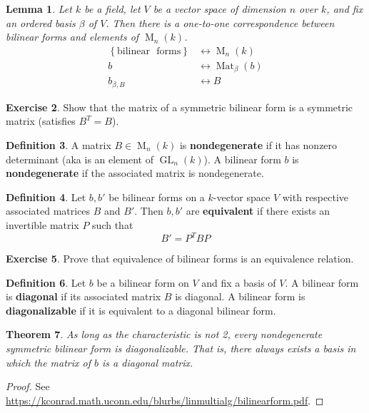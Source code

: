 \documentclass[12pt]{article}
\newtheorem{theorem}{Theorem}
\newtheorem{lemma}[theorem]{Lemma}
\theoremstyle{definition}
\newtheorem{definition}[theorem]{Definition}
\newtheorem{exercise}[theorem]{Exercise}
\numberwithin{theorem}{subsection}
\newcommand{\lb}{\left\{}
\newcommand{\rb}{\right\}}
\newcommand{\tbf}{\textbf}
\DeclareMathOperator{\M}{M}
\DeclareMathOperator{\Mat}{Mat}
\DeclareMathOperator{\GL}{GL}
\begin{document}
\begin{lemma}
Let $k$ be a field, let $V$ be a vector space of dimension $n$ over $k$, and fix an ordered basis $\beta$ of $V$. Then there is a one-to-one correspondence between bilinear forms and elements of $\M_n(k)$.
\begin{align*}
	\lb \mathrm{bilinear} \text{ } \mathrm{forms} \rb &\leftrightarrow \M_n(k) \\
	b &\leftrightarrow \Mat_\beta(b) \\
	b_{\beta, B} &\leftrightarrow B
\end{align*}
\end{lemma}

\begin{exercise}
Show that the matrix of a symmetric bilinear form is a symmetric matrix (satisfies $B^T = B$).
\end{exercise}

\begin{definition}
A matrix $B \in \M_n(k)$ is \tbf{nondegenerate} if it has nonzero determinant (aka is an element of $\GL_n(k)$). A bilinear form $b$ is \tbf{nondegenerate} if the associated matrix is nondegenerate.
\end{definition}

\begin{definition}
Let $b, b'$ be bilinear forms on a $k$-vector space $V$ with respective associated matrices $B$ and $B'$. Then $b,b'$ are \tbf{equivalent} if there exists an invertible matrix $P$ such that
\[
	B' = P^T B P
\]
\end{definition}

\begin{exercise}
Prove that equivalence of bilinear forms is an equivalence relation.
\end{exercise}

\begin{definition}
Let $b$ be a bilinear form on $V$ and fix a basis of $V$. A bilinear form is \tbf{diagonal} if its associated matrix $B$ is diagonal. A bilinear form is \tbf{diagonalizable} if it is equivalent to a diagonal bilinear form. 
\end{definition}

\begin{theorem}
\label{nondegenerate symmetric form is diagonal}
As long as the characteristic is not 2, every nondegenerate symmetric bilinear form is diagonalizable. That is, there always exists a basis in which the matrix of $b$ is a diagonal matrix.
\end{theorem}
\begin{proof}
See \url{https://kconrad.math.uconn.edu/blurbs/linmultialg/bilinearform.pdf}.
\end{proof}
\end{document}
